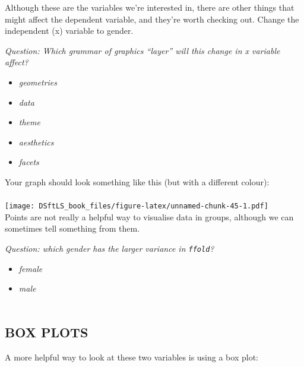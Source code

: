\documentclass[
]{book}
\providecommand{\tightlist}{%
  \setlength{\itemsep}{0pt}\setlength{\parskip}{0pt}}
\begin{document}
Although these are the variables we're interested in, there are other things that
might affect the dependent variable, and they're worth checking out. Change the
independent (x) variable to gender.

\emph{Question: Which grammar of graphics ``layer'' will this change in x variable affect?}

\begin{itemize}
\tightlist
\item
  \emph{geometries}
\item
  \emph{data}
\item
  \emph{theme}
\item
  \emph{aesthetics}
\item
  \emph{facets}\\
\end{itemize}

Your graph should look something like this (but with a different colour):\\
~\\
\texttt{[image: DSftLS\_book\_files/figure-latex/unnamed-chunk-45-1.pdf]}\\

Points are not really a helpful way to visualise data in groups, although
we can sometimes tell something from them.

\emph{Question: which gender has the larger variance in \texttt{ffold}?}

\begin{itemize}
\tightlist
\item
  \emph{female}
\item
  \emph{male}\\
  ~\\
\end{itemize}

\hypertarget{box-plots}{%
\subsection{BOX PLOTS}\label{box-plots}}

A more helpful way to look at these two variables is using a box plot:
\end{document}
